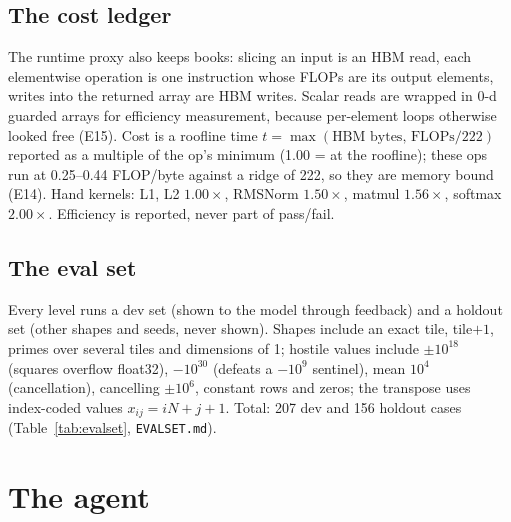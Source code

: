 \documentclass[11pt]{article}
\newcommand{\code}[1]{\texttt{#1}}
\newcommand{\E}[1]{E#1}
\begin{document}
\subsection{The cost ledger}
The runtime proxy also keeps books: slicing an input is an HBM read, each elementwise operation is one
instruction whose FLOPs are its output elements, writes into the returned array are HBM writes. Scalar
reads are wrapped in 0-d guarded arrays for efficiency measurement, because per-element loops otherwise
looked free (\E{15}). Cost is a roofline time $t=\max(\text{HBM bytes},\,\text{FLOPs}/222)$ reported as a
multiple of the op's minimum (1.00 = at the roofline); these ops run at 0.25--0.44 FLOP/byte against a
ridge of 222, so they are memory bound (\E{14}). Hand kernels: L1, L2 $1.00\times$, RMSNorm $1.50\times$,
matmul $1.56\times$, softmax $2.00\times$. Efficiency is reported, never part of pass/fail.

\subsection{The eval set}
Every level runs a dev set (shown to the model through feedback) and a holdout set (other shapes and
seeds, never shown). Shapes include an exact tile, tile$+1$, primes over several tiles and dimensions
of 1; hostile values include $\pm10^{18}$ (squares overflow float32), $-10^{30}$ (defeats a $-10^9$
sentinel), mean $10^4$ (cancellation), cancelling $\pm10^6$, constant rows and zeros; the transpose uses
index-coded values $x_{ij}=iN+j+1$. Total: 207 dev and 156 holdout cases (Table~\ref{tab:evalset},
\code{EVALSET.md}).

\begin{table}[h]
\centering
\resizebox{\linewidth}{!}{}
\caption{Eval set by level (generated by \code{scripts/list\_cases.py}).}
\label{tab:evalset}
\end{table}

\section{The agent}
\label{sec:agent}
\end{document}
